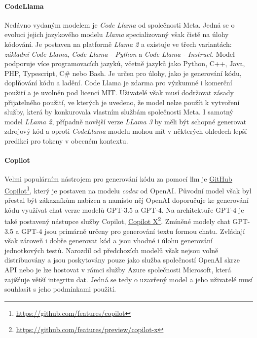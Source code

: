 \documentclass[czech, ma, kiv, he, iso690numb, pdf, viewonly]{fasthesis}
\begin{document}
    \paragraph{CodeLlama} Nedávno vydaným modelem je \textit{Code Llama} od společnosti Meta. Jedná se o evoluci jejich jazykového modelu \textit{Llama} specializovaný však čistě na úlohy kódování. Je postaven na platformě \textit{Llama 2} a existuje ve třech variantách: \textit{základní Code Llama}, \textit{Code Llama - Python} a \textit{Code Llama - Instruct}. Model podporuje více programovacích jazyků, včetně jazyků jako Python, C++, Java, PHP, Typescript, C# nebo Bash. Je určen pro úlohy, jako je generování kódu, doplňování kódu a ladění. Code Llama je zdarma pro výzkumné i komerční použití a je uvolněn pod licencí MIT. Uživatelé však musí dodržovat  zásady přijatelného použití, ve kterých je uvedeno, že model nelze použít k vytvoření služby, která by konkurovala vlastním službám společnosti Meta. \cite{roziere2024code} I samotný model \textit{LLama 2}, případně novější verze \textit{LLama 3} by měli být schopné generovat zdrojový kód a oproti \textit{CodeLlama} modelu mohou mít v některých ohledech lepší predikci pro tokeny v obecném kontextu. \cite{metallama3introduction}

    \paragraph{Copilot} Velmi populárním nástrojem pro generování kódu za pomocí \gls{llm} je \href{https://github.com/features/copilot}{GitHub Copilot}\footnote{\url{https://github.com/features/copilot}}, který je postaven na modelu \textit{codex} od OpenAI. Původní model však byl přestal být zákazníkům nabízen a namísto něj OpenAI doporučuje ke generování kódu využívat chat verze modelů GPT-3.5 a GPT-4. Na architektuře GPT-4 je také postavený nástupce služby Copilot, \href{https://github.com/features/preview/copilot-x}{Copilot X}\footnote{\url{https://github.com/features/preview/copilot-x}}. Zmíněné modely chat GPT-3.5 a GPT-4 jsou primárně určeny pro generování textu formou chatu. Zvládají však zároveň i dobře generovat kód a jsou vhodné i úlohu generování jednotkových testů. \cite{openai2024gpt4} Narozdíl od předchozích modelů však nejsou volně distribuovány a jsou poskytovány pouze jako služba společností OpenAI skrze API nebo je lze hostovat v rámci služby Azure společnosti Microsoft, která zajišťuje větší integritu dat. Jedná se tedy o uzavřený model a jeho uživatelé musí souhlasit s jeho podmínkami použití.
\end{document}
